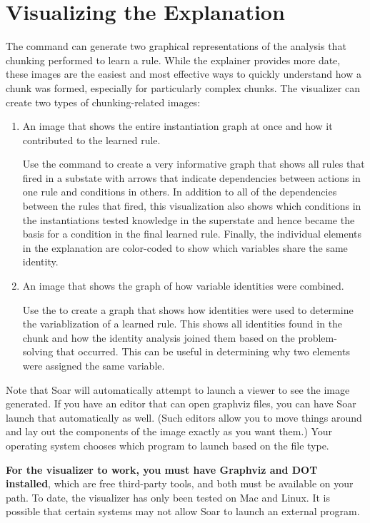 \section{Visualizing the Explanation}

The  command can generate two graphical representations of the analysis that chunking performed to learn a rule. While the explainer provides more date, these images are the easiest and most effective ways to quickly understand how a chunk was formed, especially for particularly complex chunks.  The visualizer can create two types of chunking-related images:

\begin{enumerate}
	\item An image that shows the entire instantiation graph at once and how it contributed to the learned rule.

	Use the command  to create a very informative graph that shows all rules that fired in a substate with arrows that indicate dependencies between actions in one rule and conditions in others. In addition to all of the dependencies between the rules that fired, this visualization also shows which conditions in the instantiations tested knowledge in the superstate and hence became the basis for a condition in the final learned rule.  Finally, the individual elements in the explanation are color-coded to show which variables share the same identity.


	\item An image that shows the graph of how variable identities were combined.

	Use the  to create a graph that shows how identities were used to determine the variablization of a learned rule. This shows all identities found in the chunk and how the identity analysis joined them based on the problem-solving that occurred. This can be useful in determining why two elements were assigned the same variable.
\end{enumerate}

Note that Soar will automatically attempt to launch a viewer to see the image generated. If you have an editor that can open graphviz files, you can have Soar launch that automatically as well. (Such editors allow you to move things around and lay out the components of the image exactly as you want them.) Your operating system chooses which program to launch based on the file type.

\textbf{For the visualizer to work, you must have Graphviz and DOT installed}, which are free third-party tools, and both must be available on your path.  To date, the visualizer has only been tested on Mac and Linux.  It is possible that certain systems may not allow Soar to launch an external program.
